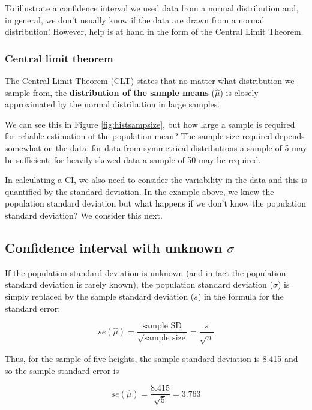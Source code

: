 \documentclass[
  oneside]{krantz}
\begin{document}
To illustrate a confidence interval we used data from a normal distribution and, in general, we don't usually know if the data are drawn from a normal distribution! However, help is at hand in the form of the Central Limit Theorem.

\hypertarget{central-limit-theorem}{%
\subsubsection{Central limit theorem}\label{central-limit-theorem}}

The Central Limit Theorem (CLT) states that no matter what distribution we sample from, the \textbf{distribution of the sample means} (\(\hat \mu\)) is closely approximated by the normal distribution in large samples.

We can see this in Figure \ref{fig:histsampsize}, but how large a sample is required for reliable estimation of the population mean? The sample size required depends somewhat on the data: for data from symmetrical distributions a sample of 5 may be sufficient; for heavily skewed data a sample of 50 may be required.

In calculating a CI, we also need to consider the variability in the data and this is quantified by the standard deviation. In the example above, we knew the population standard deviation but what happens if we don't know the population standard deviation? We consider this next.

\hypertarget{confidence-interval-with-unknown-sigma}{%
\subsection{\texorpdfstring{Confidence interval with unknown \(\sigma\)}{Confidence interval with unknown \textbackslash sigma}}\label{confidence-interval-with-unknown-sigma}}

If the population standard deviation is unknown (and in fact the population standard deviation is rarely known), the population standard deviation (\(\sigma\)) is simply replaced by the sample standard deviation (\(s\)) in the formula for the standard error:

\[se(\hat \mu)=\frac{\textrm{sample SD}}{\sqrt{\textrm{sample size}}} = \frac{s}{\sqrt{n}}\]

Thus, for the sample of five heights, the sample standard deviation is 8.415 and so the sample standard error is

\[se(\hat \mu) = \frac{8.415}{\sqrt{5}} = 3.763\]
\end{document}

